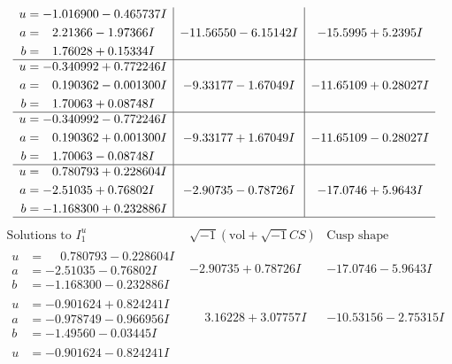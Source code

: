 \documentclass[1p]{elsarticle_modified}
\theoremstyle{definition}
\newcommand{\I}{\sqrt{-1}}
\begin{document}
$$\begin{array}{c|c|c}
\begin{aligned}
u &= -1.016900 - 0.465737 I \\
a &= \phantom{-}2.21366 - 1.97366 I \\
b &= \phantom{-}1.76028 + 0.15334 I\end{aligned}
 & -11.56550 - 6.15142 I & -15.5995 + 5.2395 I \\ \hline\begin{aligned}
u &= -0.340992 + 0.772246 I \\
a &= \phantom{-}0.190362 - 0.001300 I \\
b &= \phantom{-}1.70063 + 0.08748 I\end{aligned}
 & -9.33177 - 1.67049 I & -11.65109 + 0.28027 I \\ \hline\begin{aligned}
u &= -0.340992 - 0.772246 I \\
a &= \phantom{-}0.190362 + 0.001300 I \\
b &= \phantom{-}1.70063 - 0.08748 I\end{aligned}
 & -9.33177 + 1.67049 I & -11.65109 - 0.28027 I \\ \hline\begin{aligned}
u &= \phantom{-}0.780793 + 0.228604 I \\
a &= -2.51035 + 0.76802 I \\
b &= -1.168300 + 0.232886 I\end{aligned}
 & -2.90735 - 0.78726 I & -17.0746 + 5.9643 I\\
 \hline 
 \end{array}$$\newpage$$\begin{array}{c|c|c}  
\text{Solutions to }I^u_{1}& \I (\text{vol} + \sqrt{-1}CS) & \text{Cusp shape}\\
 \hline 
\begin{aligned}
u &= \phantom{-}0.780793 - 0.228604 I \\
a &= -2.51035 - 0.76802 I \\
b &= -1.168300 - 0.232886 I\end{aligned}
 & -2.90735 + 0.78726 I & -17.0746 - 5.9643 I \\ \hline\begin{aligned}
u &= -0.901624 + 0.824241 I \\
a &= -0.978749 - 0.966956 I \\
b &= -1.49560 - 0.03445 I\end{aligned}
 & \phantom{-}3.16228 + 3.07757 I & -10.53156 - 2.75315 I \\ \hline\begin{aligned}
u &= -0.901624 - 0.824241 I \\

\end{aligned}
\end{array}$$
\end{document}
